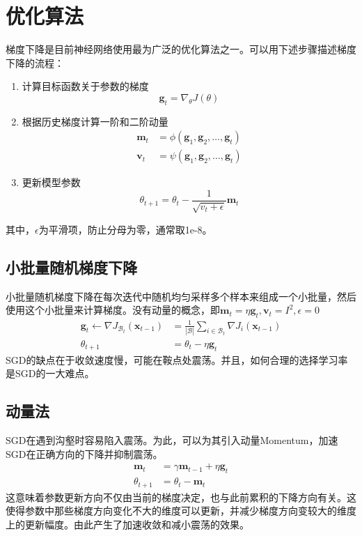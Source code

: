 \section{优化算法}
梯度下降是目前神经网络使用最为广泛的优化算法之一。可以用下述步骤描述梯度下降的流程：
\begin{enumerate}
	\item 计算目标函数关于参数的梯度
	\begin{equation}
		\boldsymbol{g}_t = \nabla_{\theta} J(\theta)
	\end{equation}
	\item 根据历史梯度计算一阶和二阶动量
	\begin{equation}
		\begin{aligned}
			\boldsymbol{m}_t &= \phi(\boldsymbol{g}_1, \boldsymbol{g}_2, \dots, \boldsymbol{g}_t) \\
			\boldsymbol{v}_t &= \psi(\boldsymbol{g}_1, \boldsymbol{g}_2, \dots, \boldsymbol{g}_t)
		\end{aligned}
	\end{equation}
	\item 更新模型参数
	\begin{equation}
		\theta_{t+1} = \theta_{t} - \frac{1}{\sqrt{v_t + \epsilon}}\boldsymbol{m}_t
	\end{equation}
\end{enumerate}

其中，$\epsilon$为平滑项，防止分母为零，通常取1e-8。
\subsection{小批量随机梯度下降}
小批量随机梯度下降在每次迭代中随机均匀采样多个样本来组成一个小批量，然后使用这个小批量来计算梯度。没有动量的概念，即$\boldsymbol{m}_t=\eta \boldsymbol{g}_t, \boldsymbol{v}_t=I^2,\epsilon = 0$
\begin{equation}
\begin{aligned}
	\boldsymbol{g}_t \leftarrow \nabla J_{\mathcal{B}_t}(\boldsymbol{x}_{t-1})  &= \frac{1}{|\mathcal{B}|}\sum_{i \in \mathcal{B}_t}\nabla J_i(\boldsymbol{x}_{t-1})\\
	\theta_{t+1} &= \theta_{t} - \eta \boldsymbol{g}_t
\end{aligned}
\end{equation}
SGD的缺点在于收敛速度慢，可能在鞍点处震荡。并且，如何合理的选择学习率是SGD的一大难点。
\subsection{动量法}
SGD在遇到沟壑时容易陷入震荡。为此，可以为其引入动量Momentum，加速SGD在正确方向的下降并抑制震荡。
\begin{equation}
\begin{aligned}
	\boldsymbol{m}_t&=\gamma \boldsymbol{m}_{t-1} + \eta \boldsymbol{g}_t\\
	\theta_{t+1} &= \theta_{t} - \boldsymbol{m}_t
\end{aligned}
\end{equation}
这意味着参数更新方向不仅由当前的梯度决定，也与此前累积的下降方向有关。这使得参数中那些梯度方向变化不大的维度可以更新，并减少梯度方向变较大的维度上的更新幅度。由此产生了加速收敛和减小震荡的效果。

